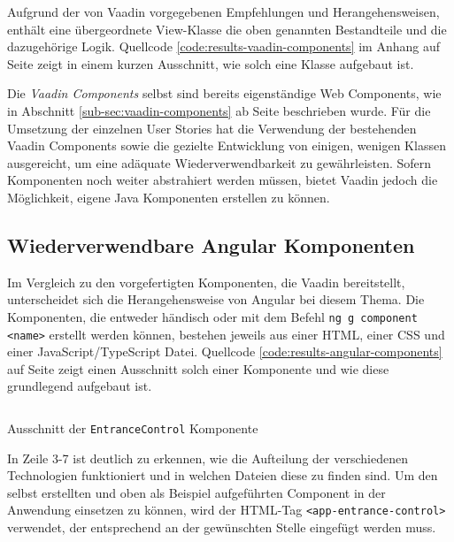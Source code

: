 \documentclass[a4paper,12pt,twoside]{scrreprt}
\begin{document}
Aufgrund der von Vaadin vorgegebenen Empfehlungen und Herangehensweisen, enthält eine übergeordnete View-Klasse die oben genannten Bestandteile und die dazugehörige Logik. Quellcode \ref{code:results-vaadin-components} im Anhang auf Seite \pageref{code:results-vaadin-components} zeigt in einem kurzen Ausschnitt, wie solch eine Klasse aufgebaut ist.

\medskip

Die \textit{Vaadin Components} selbst sind bereits eigenständige Web Components, wie in Abschnitt \ref{sub-sec:vaadin-components} ab Seite \pageref{sub-sec:vaadin-components} beschrieben wurde. Für die Umsetzung der einzelnen User Stories hat die Verwendung der bestehenden Vaadin Components sowie die gezielte Entwicklung von einigen, wenigen Klassen ausgereicht, um eine adäquate Wiederverwendbarkeit zu gewährleisten. Sofern Komponenten noch weiter abstrahiert werden müssen, bietet Vaadin jedoch die Möglichkeit, eigene Java Komponenten erstellen zu können.

\subsection{Wiederverwendbare Angular Komponenten}
\label{sub-sec:results-wiederverwendbarkeit-angular}
Im Vergleich zu den vorgefertigten Komponenten, die Vaadin bereitstellt, unterscheidet sich die Herangehensweise von Angular bei diesem Thema. Die Komponenten, die entweder händisch oder mit dem Befehl \texttt{ng g component <name>} erstellt werden können, bestehen jeweils aus einer HTML, einer CSS und einer JavaScript/TypeScript Datei. Quellcode \ref{code:results-angular-components} auf Seite \pageref{code:results-angular-components} zeigt einen Ausschnitt solch einer Komponente und wie diese grundlegend aufgebaut ist.

\begin{listing}[ht]
    \renewcommand{\fcolorbox}[4][]{#4}
    \inputminted[fontsize=\footnotesize,linenos,breaklines]{js}{code/Luidold_Results-Angular-Components-CodeSample.ts}
    \caption[Ausschnitt der \texttt{EntranceControl} Komponente]{Ausschnitt der \texttt{EntranceControl} Komponente}
    \label{code:results-angular-components}
\end{listing}

In Zeile 3-7 ist deutlich zu erkennen, wie die Aufteilung der verschiedenen Technologien funktioniert und in welchen Dateien diese zu finden sind. Um den selbst erstellten und oben als Beispiel aufgeführten Component in der Anwendung einsetzen zu können, wird der HTML-Tag \texttt{<app-entrance-control>} verwendet, der entsprechend an der gewünschten Stelle eingefügt werden muss.
\end{document}
